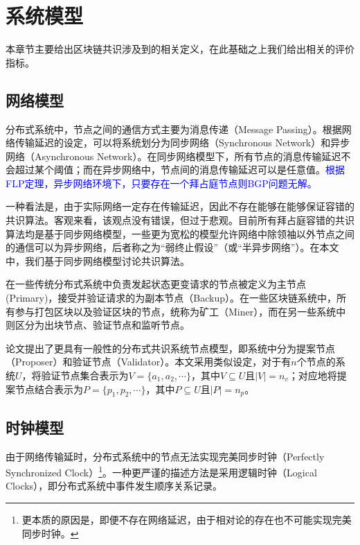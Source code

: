 \section{系统模型}
本章节主要给出区块链共识涉及到的相关定义，在此基础之上我们给出相关的评价指标。

\subsection{网络模型}
分布式系统中，节点之间的通信方式主要为消息传递（Message Passing）。根据网络传输延迟的设定，可以将系统划分为同步网络（Synchronous Network）和异步网络（Asynchronous Network）。在同步网络模型下，所有节点的消息传输延迟不会超过某个阈值；而在异步网络中，节点间的消息传输延迟可以是任意值。\textcolor{blue}{根据FLP定理\cite{fischer1982impossibility}，异步网络环境下，只要存在一个拜占庭节点则BGP问题无解。}

一种看法是，由于实际网络一定存在传输延迟，因此不存在能够在能够保证容错的共识算法。客观来看，该观点没有错误，但过于悲观。目前所有拜占庭容错的共识算法均是基于同步网络模型，一些更为宽松的模型允许网络中除领袖以外节点之间的通信可以为异步网络，后者称之为“弱终止假设”（或“半异步网络”）\cite{castro1999practical}。在本文中，我们基于同步网络模型讨论共识算法。

在一些传统分布式系统中负责发起状态更变请求的节点被定义为主节点(Primary)，接受并验证请求的为副本节点（Backup）\cite{lamport2001paxos,castro1999practical}。在一些区块链系统中，所有参与打包区块以及验证区块的节点，统称为矿工（Miner），而在另一些系统中则区分为出块节点、验证节点和监听节点\cite{ultrain2019}。

论文\cite{howard2019consensus}提出了更具有一般性的分布式共识系统节点模型，即系统中分为提案节点（Proposer）和验证节点（Validator）。本文采用类似设定，对于有$n$个节点的系统$U$，将验证节点集合表示为$V=\{a_1,a_2,\cdots\}$，其中$V\subseteq U$且$|V|=n_v$；对应地将提案节点结合表示为$P=\{p_1,p_2,\cdots\}$，其中$P\subseteq U$且$|P|=n_p$。


\subsection{时钟模型}

由于网络传输延时，分布式系统中的节点无法实现完美同步时钟（Perfectly Synchronized Clock）\footnote{更本质的原因是，即便不存在网络延迟，由于相对论的存在也不可能实现完美同步时钟。}。一种更严谨的描述方法是采用逻辑时钟（Logical Clocks）\cite{lamport1978time}，即分布式系统中事件发生顺序关系记录。

